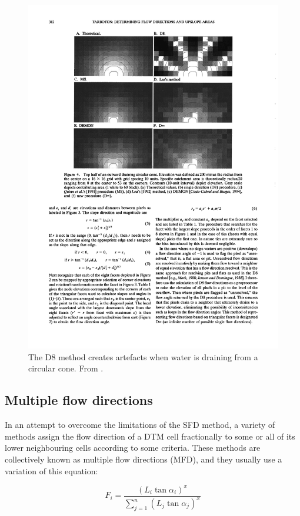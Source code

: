 \begin{figure}
\centering
\includegraphics[width=0.95\linewidth]{figs/d8.pdf}
\caption{The D8 method creates artefacts when water is draining from a circular cone. From \citet{Tarborton97}.}%
\label{fig:d8}
\end{figure}

\subsection{Multiple flow directions}

In an attempt to overcome the limitations of the SFD method, a variety of methods assign the flow direction of a DTM cell fractionally to some or all of its lower neighbouring cells according to some criteria.
These methods are collectively known as multiple flow directions (MFD), 
and they usually use a variation of this equation:

\begin{equation}
F_i = \frac{\left(L_i \tan{\alpha_i}\right)^x}{\sum_{j=1}^{n}\left(L_j \tan{\alpha_j}\right)^x}
\end{equation}

